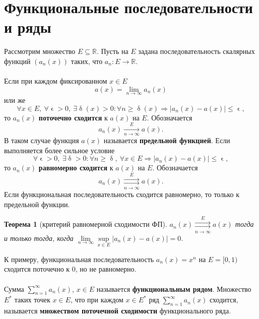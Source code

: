 \documentclass[a4paper, 12pt]{report}
\numberwithin{equation}{section}
\renewcommand{\leq}{\leqslant}
\renewcommand{\geq}{\geqslant}
\renewcommand{\delta}{\updelta}
\renewcommand{\epsilon}{\upvarepsilon}
\newtheorem*{theorem}{Теорема}
\begin{document}
	\section{Функциональные последовательности и ряды}
	Рассмотрим множество $E \subseteq \mathbb R$. Пусть на $E$ задана последовательность скалярных функций $(a_n(x))$ таких, что $a_n:E \to \mathbb R$. 
	\\\\
	Если при каждом фиксированном $x \in E$ 
	\begin{equation*}
		a(x) = \lim\limits_{n\to\infty} a_n(x)
	\end{equation*}
	или же
	\begin{equation*}
		\forall  x \in E,\ \forall \epsilon > 0,\ \exists \delta(x) > 0 : \forall n \geq \delta(x) \Rightarrow |a_n(x) - a(x)| \leq \epsilon, 
	\end{equation*}
	то $a_n(x)$ \textbf{поточечно сходится} к $a(x)$ на $E$. Обозначается \begin{equation*}
		a_n(x) \xrightarrow[n\to\infty]{E} a(x).
	\end{equation*} 
	В таком случае функция $a(x)$ называется \textbf{предельной функцией}.
	Если выполняется более сильное условие
	\begin{equation*}
		\forall \epsilon > 0,\ \exists \delta > 0 : \forall n \geq \delta,\ \forall x \in E \Rightarrow|a_n(x) - a(x)|\leq \epsilon,
	\end{equation*}
	то $a_n(x)$ \textbf{равномерно сходится} к $a(x)$ на $E$. Обозначается
	\begin{equation*}
		a_n(x) \underset{n\to \infty}{\overset{E}{\rightrightarrows}} a(x).
	\end{equation*}
	Если функциональная последовательность сходится равномерно, то только к предельной функции.
	\begin{theorem}
		[критерий равномерной сходимости ФП]
		$a_n(x) \underset{n\to \infty}{\overset{E}{\rightrightarrows}} a(x)$ тогда и только тогда, когда $\lim\limits_{n\to\infty}\underset{x \in E}{\sup}|a_n(x) - a(x)| = 0$.
	\end{theorem}
	\noindent
	К примеру, функциональная последовательность $a_n(x) = x^n$ на $E = [0,1)$ сходится поточечно к 0, но не равномерно.
	\\\\
	Сумма $\sum_{n=1}^\infty a_n(x)$, $x \in E$ называется \textbf{функциональным рядом}. Множество $E^*$ таких точек $x\in E$, что при каждом $x \in E^*$ ряд $\sum_{n=1}^\infty a_n(x)$ сходится, называется \textbf{множеством поточечной сходимости} функционального ряда.
\end{document}
